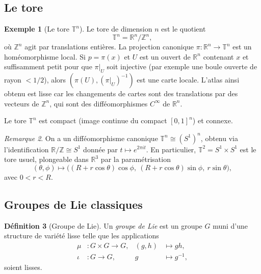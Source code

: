 \documentclass[12pt,a4paper,openany]{book}
\theoremstyle{definition}
\newtheorem{definition}{Définition}[chapter]
\newtheorem{exemple}[definition]{Exemple}
\theoremstyle{plain}
\theoremstyle{remark}
\newtheorem{remarque}[definition]{Remarque}
\newcommand{\Z}{\mathbb{Z}}
\newcommand{\R}{\mathbb{R}}
\begin{document}
\subsection{Le tore}

\begin{exemple}[Le tore $\mathbb{T}^n$]\label{ex:tore}
Le tore de dimension $n$ est le quotient
\[
    \mathbb{T}^n = \R^n / \Z^n,
\]
où $\Z^n$ agit par translations entières. La projection canonique $\pi \colon
\R^n \to \mathbb{T}^n$ est un homéomorphisme local. Si $p = \pi(x)$ et $U$ est
un ouvert de $\R^n$ contenant $x$ et suffisamment petit pour que $\pi|_U$ soit
injective (par exemple une boule ouverte de rayon $< 1/2$), alors $(
\pi(U), (\pi|_U)^{-1})$ est une carte locale. L'atlas ainsi obtenu est lisse
car les changements de cartes sont des translations par des vecteurs de $\Z^n$,
qui sont des difféomorphismes $C^\infty$ de $\R^n$.

Le tore $\mathbb{T}^n$ est compact (image continue du compact $[0,1]^n$) et
connexe.
\end{exemple}

\begin{remarque}\label{rem:tore-produit}
On a un difféomorphisme canonique $\mathbb{T}^n \cong (S^1)^n$, obtenu via
l'identification $\R/\Z \cong S^1$ donnée par $t \mapsto e^{2\pi i t}$.
En particulier, $\mathbb{T}^2 = S^1 \times S^1$ est le tore usuel, plongeable
dans $\R^3$ par la paramétrisation
\[
    (\theta, \phi) \longmapsto \big((R + r\cos\theta)\cos\phi,\
    (R + r\cos\theta)\sin\phi,\ r\sin\theta\big),
\]
avec $0 < r < R$.
\end{remarque}

\subsection{Groupes de Lie classiques}
\label{subsec:groupes-Lie}

\begin{definition}[Groupe de Lie]\label{def:groupe-Lie}
Un \emph{groupe de Lie} est un groupe $G$ muni d'une structure de variété lisse
telle que les applications
\begin{align*}
    \mu &\colon G \times G \to G, & (g, h) &\mapsto gh, \\
    \iota &\colon G \to G, & g &\mapsto g^{-1},
\end{align*}
soient lisses.
\end{definition}
\end{document}
